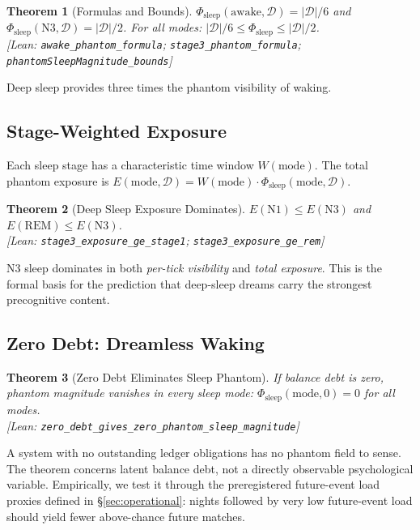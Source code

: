 \documentclass[11pt, a4paper]{article}
\newcommand{\leanref}[1]{\texttt{\small #1}}
\newtheorem{theorem}{Theorem}[section]
\theoremstyle{definition}
\theoremstyle{remark}
\begin{document}
\begin{theorem}[Formulas and Bounds]\label{thm:formulas}
$\Phi_{\mathrm{sleep}}(\mathrm{awake}, \mathcal{D})
= |\mathcal{D}|/6$ and
$\Phi_{\mathrm{sleep}}(\mathrm{N3}, \mathcal{D})
= |\mathcal{D}|/2$.
For all modes: $|\mathcal{D}|/6 \leq \Phi_{\mathrm{sleep}} \leq
|\mathcal{D}|/2$.\\
\textup{[Lean: \leanref{awake\_phantom\_formula};
\leanref{stage3\_phantom\_formula};
\leanref{phantomSleepMagnitude\_bounds}]}
\end{theorem}

Deep sleep provides three times the phantom visibility of waking.

\subsection{Stage-Weighted Exposure}

Each sleep stage has a characteristic time window $W(\mathrm{mode})$.
The total phantom exposure is
$E(\mathrm{mode}, \mathcal{D})
= W(\mathrm{mode}) \cdot \Phi_{\mathrm{sleep}}(\mathrm{mode},
\mathcal{D})$.

\begin{theorem}[Deep Sleep Exposure Dominates]\label{thm:exposure}
$E(\mathrm{N1}) \leq E(\mathrm{N3})$ and
$E(\mathrm{REM}) \leq E(\mathrm{N3})$.\\
\textup{[Lean: \leanref{stage3\_exposure\_ge\_stage1};
\leanref{stage3\_exposure\_ge\_rem}]}
\end{theorem}

N3 sleep dominates in both \emph{per-tick visibility} and
\emph{total exposure}. This is the formal basis for the prediction
that deep-sleep dreams carry the strongest precognitive content.

\subsection{Zero Debt: Dreamless Waking}

\begin{theorem}[Zero Debt Eliminates Sleep Phantom]\label{thm:dreamless}
If balance debt is zero, phantom magnitude vanishes in every sleep
mode:
$\Phi_{\mathrm{sleep}}(\mathrm{mode}, 0) = 0$
for all modes.\\
\textup{[Lean:
\leanref{zero\_debt\_gives\_zero\_phantom\_sleep\_magnitude}]}
\end{theorem}

A system with no outstanding ledger obligations has no phantom field
to sense. The theorem concerns latent balance debt, not a directly
observable psychological variable. Empirically, we test it through
the preregistered future-event load proxies defined in
\S\ref{sec:operational}: nights followed by very low future-event load
should yield fewer above-chance future matches.
\end{document}
